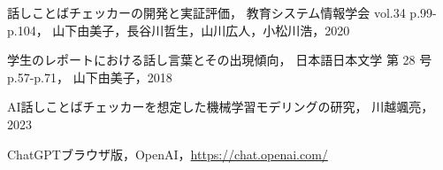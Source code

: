 \clearpage
{} %
\renewcommand{\bibname}{参考文献} %
\begin{thebibliography}{99999}

話しことばチェッカーの開発と実証評価， 教育システム情報学会 vol.34 p.99-p.104， 山下由美子，長谷川哲生，山川広人，小松川浩，2020

学生のレポートにおける話し言葉とその出現傾向， 日本語日本文学 第 28 号 p.57-p.71， 山下由美子，2018

AI話しことばチェッカーを想定した機械学習モデリングの研究， 川越颯亮， 2023

ChatGPTブラウザ版，OpenAI，\url{https://chat.openai.com/}


\end{thebibliography}
